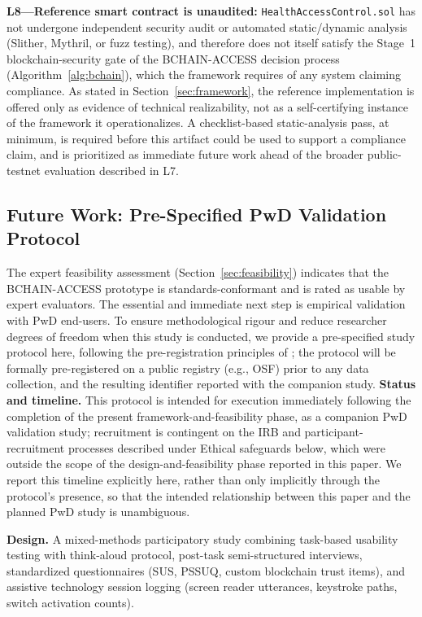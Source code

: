 \documentclass[journal,onecolumn]{IEEEtran}
\begin{document}
\textbf{L8---Reference smart contract is unaudited:} \texttt{HealthAccessControl.sol} has not undergone independent security audit or automated static/dynamic analysis (Slither, Mythril, or fuzz testing), and therefore does not itself satisfy the Stage~1 blockchain-security gate of the BCHAIN-ACCESS decision process (Algorithm~\ref{alg:bchain}), which the framework requires of any system claiming compliance. As stated in Section~\ref{sec:framework}, the reference implementation is offered only as evidence of technical realizability, not as a self-certifying instance of the framework it operationalizes. A checklist-based static-analysis pass, at minimum, is required before this artifact could be used to support a compliance claim, and is prioritized as immediate future work ahead of the broader public-testnet evaluation described in L7.

\subsection{Future Work: Pre-Specified PwD Validation Protocol}
\label{sec:future-work}
\label{sec:pwd-validation}

The expert feasibility assessment (Section~\ref{sec:feasibility}) indicates that the BCHAIN-ACCESS prototype is standards-conformant and is rated as usable by expert evaluators. The essential and immediate next step is empirical validation with PwD end-users. To ensure methodological rigour and reduce researcher degrees of freedom when this study is conducted, we provide a pre-specified study protocol here, following the pre-registration principles of \cite{nosek2018preregistration}; the protocol will be formally pre-registered on a public registry (e.g., OSF) prior to any data collection, and the resulting identifier reported with the companion study. \textbf{Status and timeline.} This protocol is intended for execution immediately following the completion of the present framework-and-feasibility phase, as a companion PwD validation study; recruitment is contingent on the IRB and participant-recruitment processes described under Ethical safeguards below, which were outside the scope of the design-and-feasibility phase reported in this paper. We report this timeline explicitly here, rather than only implicitly through the protocol's presence, so that the intended relationship between this paper and the planned PwD study is unambiguous.

\textbf{Design.} A mixed-methods participatory study combining task-based usability testing with think-aloud protocol, post-task semi-structured interviews, standardized questionnaires (SUS, PSSUQ, custom blockchain trust items), and assistive technology session logging (screen reader utterances, keystroke paths, switch activation counts).
\end{document}
